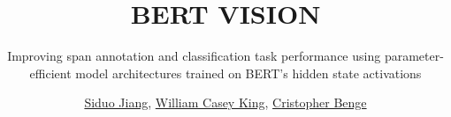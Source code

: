 \documentclass[final,colophon]{caldoc}
\author
{
		\href{https://www.linkedin.com/in/siduojiang/}{Siduo Jiang}, 
		\href{https://jackson.yale.edu/person/casey-king/}{William Casey King}, 
		\href{https://cbenge509.github.io/}{Cristopher Benge}
}
\title{BERT \textcolor{calberkeleyblue}{VISION}}
\subtitle{Improving span annotation and classification task performance using parameter-efficient model architectures trained on BERT's hidden state activations}
\begin{document}

	\caltitle

    \tableofcontents
	

	
	
	
	


	
	

\end{document}
